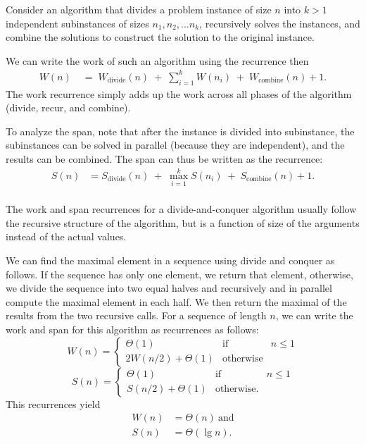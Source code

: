 \begin{gram}
Consider an algorithm that divides a problem instance of size $n$ into
$k > 1$ independent subinstances of sizes $n_1, n_2, \ldots n_k$,
recursively solves the instances, and combine the solutions to
construct the solution to the original instance.

We can write the work of such an algorithm using the recurrence then
\begin{align*}
  W(n) \;&=\; W_{\textrm{divide}}(n) \;+\; \sum_{i=1}^k W(n_i) \;+\; W_{\textrm{combine}}(n) + 1.
\end{align*}
%
The work recurrence simply adds up the work across all phases of the
algorithm (divide, recur, and combine).

To analyze the span, note that after the instance is divided into
subinstance, the subinstances can be solved in parallel (because they
are independent), and the results can be combined.  The span can thus
be written as the recurrence:
%
\begin{align*}
S(n) &= S_{\textrm{divide}}(n) \;+\; \max_{i=1}^k S(n_i) \;+\; S_{\textrm{combine}}(n) + 1.\\
\end{align*}
\end{gram}

\begin{note}
The work and span recurrences for a divide-and-conquer algorithm
usually follow the recursive structure of the algorithm, but is a
function of size of the arguments instead of the actual values.
\end{note}


\begin{example}
We can find the maximal element in a sequence using divide and conquer
as follows.
%
If the sequence has only one element, we return that element,
otherwise, we divide the sequence into two equal halves and
recursively and in parallel compute the maximal element in each half.
%
We then return the maximal of the results from the two recursive
calls.
%
For a sequence of length $n$, we can write the work and span for this
algorithm as recurrences as follows:
\[
W(n) = \left\{
\begin{array}{lll}
\Theta(1) & \mbox{if} & n \le 1
\\
2W(n/2) + \Theta(1) &  \mbox{otherwise}
\end{array}
\right.
\]
%
\[
S(n) = \left\{
\begin{array}{lll}
\Theta(1) & \mbox{if} & n \le 1
\\
S(n/2) + \Theta(1) &  \mbox{otherwise}.
\end{array}
\right.
\]
%
This recurrences yield 
\begin{align*}
W(n) & = \Theta(n)~\mbox{and}
\\
S(n) & = \Theta(\lg{n}).
\end{align*}
\end{example}


